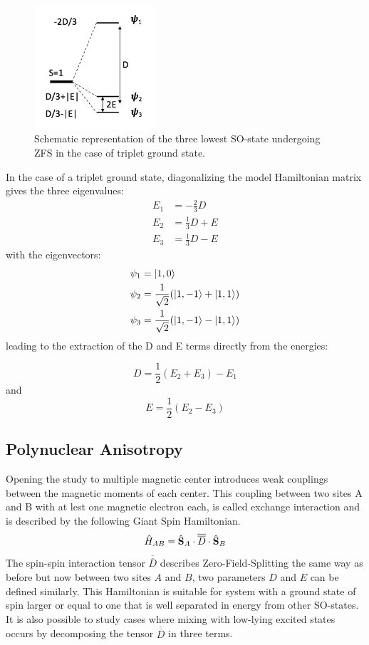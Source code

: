\documentclass[10pt]{report}
\numberwithin{equation}{section}
\begin{document}
\begin{figure}
    \centering
    \includegraphics[width=0.4\textwidth]{Images/SpectreZFS.png}
    \caption{Schematic representation of the three lowest SO-state undergoing ZFS in the case of triplet ground state.}
    \label{SpectreZFS}
\end{figure}
In the case of a triplet ground state, diagonalizing the model Hamiltonian matrix gives the three eigenvalues:
\begin{align}
    E_1&=-\frac{2}{3}D\\
    E_2&=\frac{1}{3}D+E\\
    E_3&=\frac{1}{3}D-E
\end{align}
with the eigenvectors:
\begin{align}
    \psi_1&=\ket{1,0}\\
    \psi_2&=\frac{1}{\sqrt{2}}(\ket{1,-1}+\ket{1,1})\\
    \psi_3&=\frac{1}{\sqrt{2}}(\ket{1,-1}-\ket{1,1})
\end{align}
leading to the extraction of the D and E terms directly from the energies:

\begin{equation}
    D=\frac{1}{2}(E_2+E_3)-E_1
\end{equation}
and
\begin{equation}
    E=\frac{1}{2}(E_2-E_3)
\end{equation}



\subsection{Polynuclear Anisotropy}
Opening the study to multiple magnetic center introduces weak couplings between the magnetic moments of each center. 
This coupling between two sites A and B with at lest one magnetic electron each, is called exchange interaction and is described by the following Giant Spin Hamiltonian.
\begin{equation}
    \hat{H}_{AB}=\hat{\vb S}_A\cdot \overline{\overline{D}} \cdot \hat{\vb S}_B
\end{equation}
The spin-spin interaction tensor $\overline{\overline{D}}$ describes Zero-Field-Splitting the same way as before but now between two sites $A$ and $B$, two parameters $D$ and $E$ can be defined similarly. 
This Hamiltonian is suitable for system with a ground state of spin larger or equal to one that is well separated in energy from other SO-states.
It is also possible to study cases where mixing with low-lying excited states occurs by decomposing the tensor $\overline{\overline{D}}$ in three terms.
\end{document}
